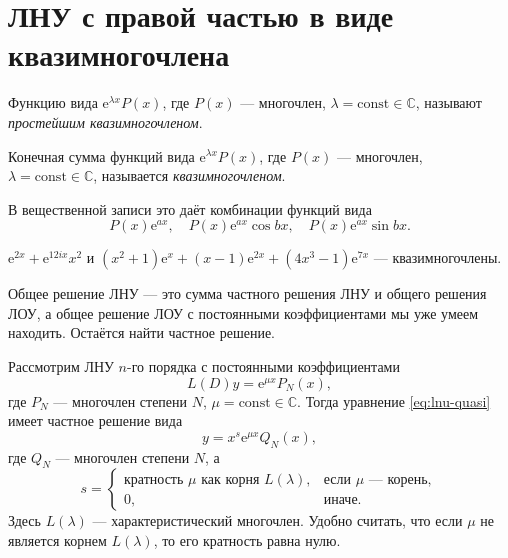 \documentclass[12pt,a4paper]{article}
\numberwithin{equation}{section}
\newcommand{\e}{\mathrm{e}}
\DeclareRobustCommand{\examtag}[1]{\space{\normalfont\small\color{HSEgray}(#1)}}
\begin{document}
\section[ЛНУ и квазимногочлен\examtag{вопрос~21}]{ЛНУ с правой частью в виде квазимногочлена\examtag{вопрос~21}}
\label{sec:quasi}

Функцию вида \(\e^{\lambda x}P(x)\), где \(P(x)\) --- многочлен, \(\lambda=\mathrm{const}\in\mathbb C\), называют \textit{простейшим квазимногочленом}.

\begin{definitionHSE}[Квазимногочлен]
Конечная сумма функций вида \(\e^{\lambda x}P(x)\), где \(P(x)\) --- многочлен, \(\lambda=\mathrm{const}\in\mathbb C\), называется \textit{квазимногочленом}.

В вещественной записи это даёт комбинации функций вида
\[
P(x)\e^{ax},\quad
P(x)\e^{ax}\cos bx,\quad
P(x)\e^{ax}\sin bx.
\]
\end{definitionHSE}

\begin{exampleHSE}
\(\e^{2x}+\e^{12ix}x^2\) и \((x^2+1)\e^{x}+(x-1)\e^{2x}+(4x^3-1)\e^{7x}\) --- квазимногочлены.
\end{exampleHSE}

Общее решение ЛНУ --- это сумма частного решения ЛНУ и общего решения ЛОУ, а общее решение ЛОУ с постоянными коэффициентами мы уже умеем находить. Остаётся найти частное решение.

\begin{theoremHSE}
Рассмотрим ЛНУ \(n\)-го порядка с постоянными коэффициентами
\begin{equation}
L(D)y=\e^{\mu x}P_N(x),
\label{eq:lnu-quasi}
\end{equation}
где \(P_N\) --- многочлен степени \(N\), \(\mu=\mathrm{const}\in\mathbb C\). Тогда уравнение \eqref{eq:lnu-quasi} имеет частное решение вида
\[
y=x^s\e^{\mu x}Q_N(x),
\]
где \(Q_N\) --- многочлен степени \(N\), а
\[
s=\begin{cases}
\text{кратность }\mu\text{ как корня }L(\lambda),&\text{если }\mu\text{ --- корень},\\
0,&\text{иначе}.
\end{cases}
\]
Здесь \(L(\lambda)\) --- характеристический многочлен. Удобно считать, что если \(\mu\) не является корнем \(L(\lambda)\), то его кратность равна нулю.
\end{theoremHSE}
\end{document}
